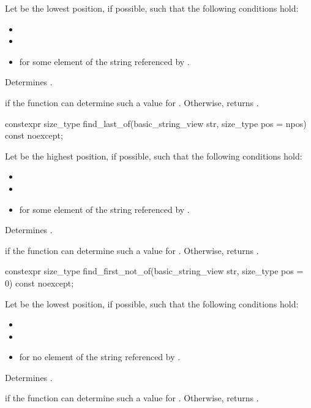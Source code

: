 \begin{itemdescr}
\pnum
Let  be the lowest position, if possible, such that the following conditions hold:
\begin{itemize}
\item
{}
\item
{}
\item
{} for some element  of the string referenced by .
\end{itemize}

\pnum
\effects
Determines .

\pnum
\returns
{} if the function can determine such a value for .
Otherwise, returns .
\end{itemdescr}

%
\begin{itemdecl}
constexpr size_type find_last_of(basic_string_view str, size_type pos = npos) const noexcept;
\end{itemdecl}

\begin{itemdescr}
\pnum
Let  be the highest position, if possible, such that the following conditions hold:
\begin{itemize}
\item
{}
\item
{}
\item
{} for some element  of the string referenced by .
\end{itemize}

\pnum
\effects
Determines .

\pnum
\returns
{} if the function can determine such a value for .
Otherwise, returns .
\end{itemdescr}

%
\begin{itemdecl}
constexpr size_type find_first_not_of(basic_string_view str, size_type pos = 0) const noexcept;
\end{itemdecl}

\begin{itemdescr}
\pnum
Let  be the lowest position, if possible, such that the following conditions hold:
\begin{itemize}
\item
{}
\item
{}
\item
{} for no element  of the string referenced by .
\end{itemize}

\pnum
\effects
Determines .

\pnum
\returns
{} if the function can determine such a value for . Otherwise, returns .
\end{itemdescr}

